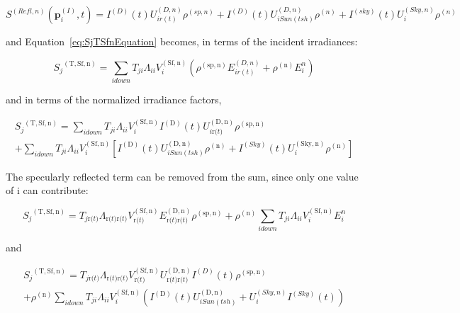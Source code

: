 \begin{equation}
S^{(Refl,n)}(\mathbf{p}_i^{(I)},t) =
  I^{(D)}(t) U_{i r(t)}^{(D,n)} \rho^{(sp,n)} +
  I^{(D)}(t) U_{i Sun(tsh)}^{(D,n)} \rho^{(n)} +
  I^{(sky)}(t) U_i^{(Sky,n)} \rho^{(n)}
\end{equation}

and Equation~\ref{eq:SjTSfnEquation} becomes, in terms of the incident irradiances:

\begin{equation}
{S_j}^{{\mathrm{(T, Sf, n)}}} = \sum\limits_{i{\mathrm{ }}down} {{T_{ji}}{\Lambda_{ii}}V_i^{{\mathrm{(Sf, n)}}}\left( {{\rho ^{{\mathrm{(sp, n)}}}}E_{i{\mathrm{ }}r(t)}^{(D,n)} + {\rho ^{{\mathrm{(n)}}}}E_i^n} \right)}
\end{equation}

and in terms of the normalized irradiance factors,

\begin{equation}
\begin{array}{c}{S_j}^{{\mathrm{(T, Sf, n)}}} = \sum\limits_{i{\mathrm{ }}down} {{T_{ji}}{\Lambda_{ii}}V_i^{{\mathrm{(Sf, n)}}}{I^{{\mathrm{(D)}}}}(t)U_{i{\mathrm{ r(}}t{\mathrm{)}}}^{{\mathrm{(D,n)}}}{\rho ^{{\mathrm{(sp, n)}}}}} \\ + \sum\limits_{i{\mathrm{ }}down} {{T_{ji}}{\Lambda_{ii}}V_i^{{\mathrm{(Sf, n)}}}\left[ {{I^{{\mathrm{(D)}}}}(t)U_{i{\mathrm{ }}Sun(tsh)}^{{\mathrm{(D,n)}}}{\rho ^{{\mathrm{(n)}}}} + {I^{(Sky)}}(t)U_i^{{\mathrm{(Sky,n)}}}{\rho ^{{\mathrm{(n)}}}}} \right]} \end{array}
\label{eq:SjTSfnidownEquation}
\end{equation}

The specularly reflected term can be removed from the sum, since only one value of i can contribute:

\begin{equation}
{S_j}^{{\mathrm{(T, Sf, n)}}} = {T_{j{\mathrm{ r(}}t{\mathrm{)}}}}{\Lambda_{{\mathrm{ r(}}t{\mathrm{) r(}}t{\mathrm{)}}}}V_{{\mathrm{ r(}}t{\mathrm{)}}}^{{\mathrm{(Sf, n)}}}E_{{\mathrm{ r(}}t{\mathrm{) r(}}t{\mathrm{)}}}^{{\mathrm{(D,n)}}}{\rho ^{{\mathrm{(sp, n)}}}} + {\rho ^{{\mathrm{(n)}}}}\sum\limits_{i{\mathrm{ }}down} {{T_{ji}}{\Lambda_{ii}}V_i^{{\mathrm{(Sf, n)}}}E_i^n}
\end{equation}

and

\begin{equation}
\begin{array}{c}{S_j}^{{\mathrm{(T, Sf, n)}}} = {T_{j{\mathrm{ r(}}t{\mathrm{)}}}}{\Lambda_{{\mathrm{ r(}}t{\mathrm{) r(}}t{\mathrm{)}}}}V_{{\mathrm{ r(}}t{\mathrm{)}}}^{{\mathrm{(Sf, n)}}}U_{{\mathrm{ r(}}t{\mathrm{) r(}}t{\mathrm{)}}}^{{\mathrm{(D,n)}}}{I^{(D)}}(t){\rho ^{{\mathrm{(sp, n)}}}}\\ + {\rho ^{{\mathrm{(n)}}}}\sum\limits_{i{\mathrm{ }}down} {{T_{ji}}{\Lambda_{ii}}V_i^{{\mathrm{(Sf, n)}}}\left( {{I^{{\mathrm{(D)}}}}(t)U_{i{\mathrm{ }}Sun(tsh)}^{{\mathrm{(D,n)}}} + U_i^{(Sky,n)}{I^{(Sky)}}(t)} \right)} \end{array}
\end{equation}

